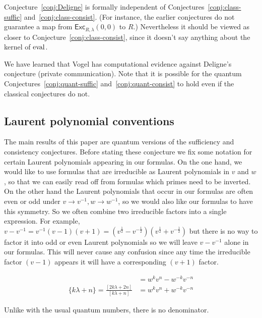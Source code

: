 \documentclass[12pt]{amsart}
\begin{document}
Conjecture~\ref{conj:Deligne} is formally independent of
Conjectures~\ref{conj:class-suffic} and~\ref{conj:class-consist}. (For
instance, the earlier conjectures do not guarantee a map from
$\mathsf{Exc}_{R,\lambda}(0,0)$ to $R$.) Nevertheless it should be
viewed as closer to Conjecture~\ref{conj:class-consist}, since it
doesn't say anything about the kernel of $\operatorname{eval}$.

\begin{remark}
  We have learned that Vogel has computational evidence against
  Deligne's conjecture (private communication). Note that it
  is possible for the quantum
  Conjectures~\ref{conj:quant-suffic} and~\ref{conj:quant-consist} to
  hold even if the classical conjectures do not.
\end{remark}

\subsection{Laurent polynomial conventions}

The main results of this paper are quantum versions of the sufficiency and
consistency conjectures.   Before stating these conjecture we fix some
notation for certain Laurent polynomials appearing in our formulas.  On the
one hand, we would like to use formulas that are irreducible as Laurent
polynomials in $v$ and $w$, so that we can easily read off from formulas which
primes need to be inverted.  On the other hand the Laurent polynomials that
occur in our formulas are often even or odd under $v \rightarrow v^{-1}, w
\rightarrow w^{-1}$, so we would also like our formulas to have this symmetry.
So we often combine two irreducible factors into a single expression.  For
example, $v-v^{-1} = v^{-1}(v-1)(v+1) =
(v^{\frac{1}{2}}-v^{-\frac{1}{2}})(v^{\frac{1}{2}}+v^{-\frac{1}{2}})$ but
there is no way to factor it into odd or even Laurent polynomials so we will
leave $v-v^{-1}$ alone in our formulas.  This will never cause any confusion
since any time the irreducible factor $(v-1)$ appears it will have a
corresponding $(v+1)$ factor.

\begin{align*}
[k\lambda + n] &= w^kv^n - w^{-k}v^{-n}\\
\{k\lambda + n\} = \frac{[2k\lambda + 2n]}{[k\lambda + n]} &= w^k v^n + w^{-k} v^{-n}
\end{align*}

\begin{warning}
Unlike with the usual quantum numbers, there is no denominator.
\end{warning}
\end{document}
